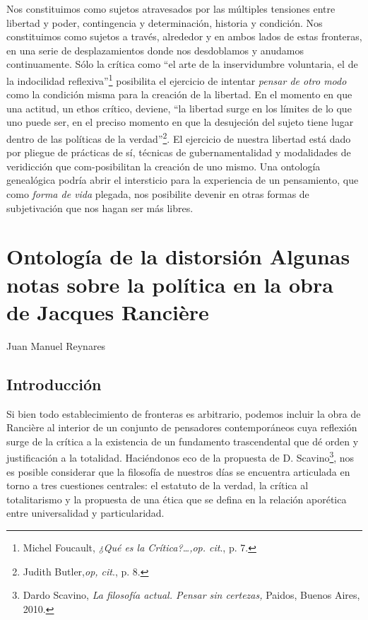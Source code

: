 Nos constituimos como sujetos atravesados por las múltiples tensiones entre libertad y poder, contingencia y determinación, historia y condición. Nos constituimos como sujetos a través, alrededor y en ambos lados de estas fronteras, en una serie de desplazamientos donde nos desdoblamos y anudamos continuamente. Sólo la crítica como \enquote{el arte de la inservidumbre voluntaria, el de la indocilidad reflexiva}\footnote{Michel Foucault, \emph{¿Qué es la Crítica?\ldots,op. cit}., p. 7.} posibilita el ejercicio de intentar \emph{pensar de otro modo} como la condición misma para la creación de la libertad. En el momento en que una actitud, un ethos crítico, deviene, \enquote{la libertad surge en los límites de lo que uno puede ser, en el preciso momento en que la desujeción del sujeto tiene lugar dentro de las políticas de la verdad}\footnote{Judith Butler,\emph{op, cit}., p. 8.}. El ejercicio de nuestra libertad está dado por pliegue de prácticas de sí, técnicas de gubernamentalidad y modalidades de veridicción que com-posibilitan la creación de uno mismo. Una ontología genealógica podría abrir el intersticio para la experiencia de un pensamiento, que como \emph{forma de vida} plegada, nos posibilite devenir en otras formas de subjetivación que nos hagan ser más libres.

\chapter{Ontología de la distorsión Algunas notas sobre la política en la obra de Jacques Rancière}

Juan Manuel Reynares

\section{Introducción}

Si bien todo establecimiento de fronteras es arbitrario, podemos incluir la obra de Rancière al interior de un conjunto de pensadores contemporáneos cuya reflexión surge de la crítica a la existencia de un fundamento trascendental que dé orden y justificación a la totalidad. Haciéndonos eco de la propuesta de D. Scavino\footnote{Dardo Scavino, \emph{La filosofía actual. Pensar sin certezas,} Paidos, Buenos Aires, 2010.}, nos es posible considerar que la filosofía de nuestros días se encuentra articulada en torno a tres cuestiones centrales: el estatuto de la verdad, la crítica al totalitarismo y la propuesta de una ética que se defina en la relación aporética entre universalidad y particularidad.

